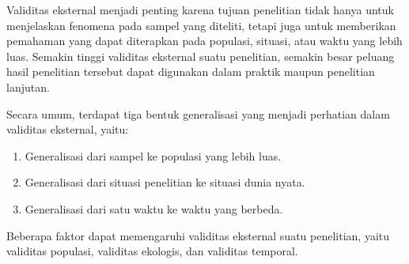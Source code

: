 \documentclass[
  indonesian,
  letterpaper,
  DIV=11,
  numbers=noendperiod]{scrreprt}
\providecommand{\tightlist}{%
  \setlength{\itemsep}{0pt}\setlength{\parskip}{0pt}}
\begin{document}
Validitas eksternal menjadi penting karena tujuan penelitian tidak hanya
untuk menjelaskan fenomena pada sampel yang diteliti, tetapi juga untuk
memberikan pemahaman yang dapat diterapkan pada populasi, situasi, atau
waktu yang lebih luas. Semakin tinggi validitas eksternal suatu
penelitian, semakin besar peluang hasil penelitian tersebut dapat
digunakan dalam praktik maupun penelitian lanjutan.

Secara umum, terdapat tiga bentuk generalisasi yang menjadi perhatian
dalam validitas eksternal, yaitu:

\begin{enumerate}
\def\labelenumi{\arabic{enumi}.}
\tightlist
\item
  Generalisasi dari sampel ke populasi yang lebih luas.
\item
  Generalisasi dari situasi penelitian ke situasi dunia nyata.
\item
  Generalisasi dari satu waktu ke waktu yang berbeda.
\end{enumerate}

Beberapa faktor dapat memengaruhi validitas eksternal suatu penelitian,
yaitu validitas populasi, validitas ekologis, dan validitas temporal.
\end{document}
